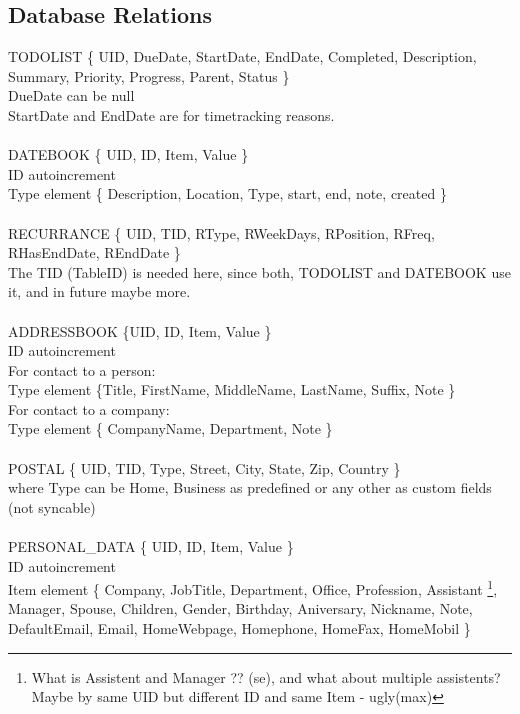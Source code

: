 
\pagebreak

\subsection{Database Relations}
TODOLIST \{ UID, DueDate, StartDate, EndDate, Completed, Description, Summary, Priority, Progress, Parent, Status \}\\
DueDate can be null \\
StartDate and EndDate are for timetracking reasons.
\\
\\
\noindent
DATEBOOK \{ UID, ID, Item, Value \}\\
ID autoincrement\\
Type element \{ Description, Location, Type, start, end, note, created \}\\
\\
\noindent
RECURRANCE \{ UID, TID, RType, RWeekDays, RPosition, RFreq, RHasEndDate, REndDate \} \\
The TID (TableID) is needed here, since both, TODOLIST and DATEBOOK use it, and in future maybe more.\\
\\
\noindent
ADDRESSBOOK \{UID, ID, Item, Value \}\\
ID autoincrement\\
For contact to a person:\\
Type element \{Title, FirstName, MiddleName, LastName, Suffix, Note \}\\  
For contact to a company:\\
Type element \{ CompanyName, Department, Note \}\\
\\
\noindent
POSTAL \{ UID, TID, Type, Street, City, State, Zip, Country \} \\
where Type can be Home, Business as predefined or any other as custom fields (not syncable) \\
\\
\noindent
PERSONAL\_DATA \{ UID, ID, Item, Value \}\\
ID autoincrement \\
Item element \{ Company, JobTitle, Department, Office, Profession, Assistant
 \footnote{What is Assistent and Manager ??  (se), and what about multiple assistents? Maybe by same UID but different ID and same Item - ugly(max)}, Manager, Spouse, Children, Gender, Birthday, Aniversary, Nickname, Note, \\
 DefaultEmail, Email, HomeWebpage, Homephone, HomeFax, HomeMobil \}\\  
